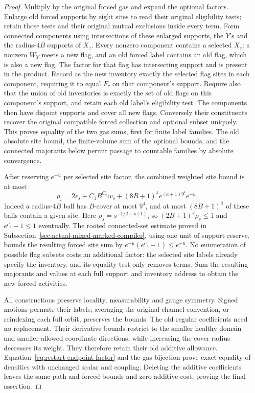 \begin{proof}
Multiply by the original forced gas and expand the optional factors.
Enlarge old forced supports by eight sites to read their original
eligibility tests; retain those tests and their original mutual
exclusions inside every term. Form connected components using
intersections of these enlarged supports, the $Y$'s and the
radius-$4B$ supports of $X_z$. Every nonzero component contains a
selected $X_z$: a nonzero $W_Y$ meets a new flag, and an old forced
label contains an old flag, which is also a new flag. The factor for
that flag has intersecting support and is present in the product.
Record as the new inventory exactly the selected flag sites in each
component, requiring it to equal $F_\tau$ on that component's support.
Require also that the union of old inventories is exactly the set of
old flags on this component's support, and retain each old label's
eligibility test. The components then
have disjoint supports and cover all new flags. Conversely their
constituents recover the original compatible forced collection and
optional subset uniquely. This proves equality of the two gas sums, first for finite label
families. The old absolute site bound, the finite-volume sum of the
optional bounds, and the connected majorants below permit passage to
countable families by absolute convergence.

After reserving $e^{-u}$ per selected site factor, the combined
weighted site bound is at most
\[
 \rho_s=2\epsilon_s+C_1B^{C_2}w_s
                 +(8B+1)^4e^{(a+1)9^4}e^{-u}.
\]
Indeed a radius-$4B$ ball has $B$-cover at most $9^4$, and at most
$(8B+1)^4$ of these balls contain a given site. Here
$\rho_s=s^{-1/2+o(1)}$, so $(2B+1)^4\rho_s\le1$ and
$e^{\rho_s}-1\le1$ eventually. The rooted connected-set estimate
proved in Subsection~\ref{sec:actual-mixed-marked-compiler}, using one
unit of support reserve, bounds the resulting forced site sum by
$e^{-u}(e^{\rho_s}-1)\le e^{-u}$. No enumeration of possible flag
subsets costs an additional factor: the selected site labels already
specify the inventory, and its equality test only removes terms.
Sum the resulting majorants and values at each full support and
inventory address to obtain the new forced activities.

All constructions preserve locality, measurability and gauge symmetry.
Signed motions permute their labels; averaging the original channel
convention, or reindexing each full orbit, preserves the bounds.
The old regular coefficients need no replacement. Their derivative
bounds restrict to the smaller healthy domain and smaller allowed
coordinate directions, while increasing the cover radius decreases
its weight. They therefore retain their old additive allowance.
Equation~\ref{eq:restart-endpoint-factor} and the gas bijection prove
exact equality of densities with unchanged scalar and coupling.
Deleting the additive coefficients leaves the same path and forced
bounds and zero additive cost, proving the final assertion.
\end{proof}

